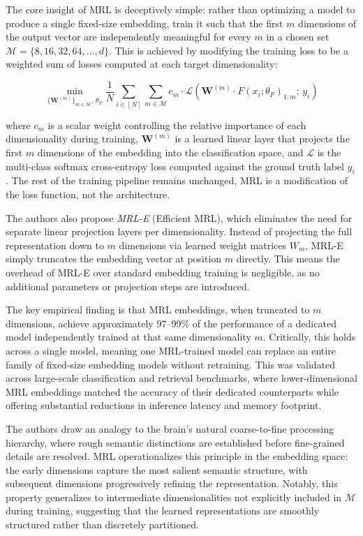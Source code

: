\documentclass[a4paper,12pt]{article}
\begin{document}
The core insight of MRL is deceptively simple: rather than optimizing a model to
produce a single fixed-size embedding, train it such that the first $m$ dimensions
of the output vector are independently meaningful for every $m$ in a chosen set
$\mathcal{M} = \{8, 16, 32, 64, \ldots, d\}$. This is achieved by modifying the
training loss to be a weighted sum of losses computed at each target dimensionality:

\begin{equation}
    \min_{\{\mathbf{W}^{(m)}\}_{m \in \mathcal{M}},\, \theta_F}
    \frac{1}{N} \sum_{i \in [N]} \sum_{m \in \mathcal{M}}
    c_m \cdot \mathcal{L}\!\left(\mathbf{W}^{(m)} \cdot F(x_i; \theta_F)_{1:m};\, y_i\right)
\end{equation}

where $c_m$ is a scalar weight controlling the relative importance of each
dimensionality during training, $\mathbf{W}^{(m)}$ is a learned linear layer
that projects the first $m$ dimensions of the embedding into the classification
space, and $\mathcal{L}$ is the multi-class softmax cross-entropy loss computed
against the ground truth label $y_i$. The rest of the training pipeline remains
unchanged, MRL is a modification of the loss function, not the architecture.

The authors also propose \textit{MRL-E} (Efficient MRL), which eliminates the need
for separate linear projection layers per dimensionality. Instead of projecting the
full representation down to $m$ dimensions via learned weight matrices $W_m$, MRL-E
simply truncates the embedding vector at position $m$ directly. This means the
overhead of MRL-E over standard embedding training is negligible, as no additional
parameters or projection steps are introduced.

The key empirical finding is that MRL embeddings, when truncated to $m$ dimensions,
achieve approximately 97--99\% of the performance of a dedicated model independently
trained at that same dimensionality $m$. Critically, this holds across a single
model, meaning one MRL-trained model can replace an entire family of fixed-size
embedding models without retraining. This was validated across large-scale
classification and retrieval benchmarks, where lower-dimensional MRL embeddings
matched the accuracy of their dedicated counterparts while offering substantial
reductions in inference latency and memory footprint.

The authors draw an analogy to the brain's natural coarse-to-fine processing
hierarchy, where rough semantic distinctions are established before fine-grained
details are resolved. MRL operationalizes this principle in the embedding space: the
early dimensions capture the most salient semantic structure, with subsequent
dimensions progressively refining the representation. Notably, this property
generalizes to intermediate dimensionalities not explicitly included in $\mathcal{M}$
during training, suggesting that the learned representations are smoothly structured
rather than discretely partitioned.
\end{document}
